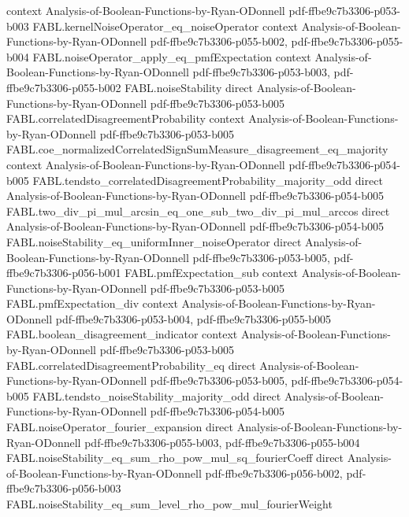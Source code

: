 \begin{theorem}
  {context}
  {Analysis-of-Boolean-Functions-by-Ryan-ODonnell}
  {pdf-ffbe9c7b3306-p053-b003}
\proofstep
  {FABL.kernelNoiseOperator_eq_noiseOperator}
  {context}
  {Analysis-of-Boolean-Functions-by-Ryan-ODonnell}
  {pdf-ffbe9c7b3306-p055-b002,
    pdf-ffbe9c7b3306-p055-b004}
\proofstep
  {FABL.noiseOperator_apply_eq_pmfExpectation}
  {context}
  {Analysis-of-Boolean-Functions-by-Ryan-ODonnell}
  {pdf-ffbe9c7b3306-p053-b003,
    pdf-ffbe9c7b3306-p055-b002}
\proofstep
  {FABL.noiseStability}
  {direct}
  {Analysis-of-Boolean-Functions-by-Ryan-ODonnell}
  {pdf-ffbe9c7b3306-p053-b005}
\proofstep
  {FABL.correlatedDisagreementProbability}
  {context}
  {Analysis-of-Boolean-Functions-by-Ryan-ODonnell}
  {pdf-ffbe9c7b3306-p053-b005}
\proofstep
  {FABL.coe_normalizedCorrelatedSignSumMeasure_disagreement_eq_majority}
  {context}
  {Analysis-of-Boolean-Functions-by-Ryan-ODonnell}
  {pdf-ffbe9c7b3306-p054-b005}
\proofstep
  {FABL.tendsto_correlatedDisagreementProbability_majority_odd}
  {direct}
  {Analysis-of-Boolean-Functions-by-Ryan-ODonnell}
  {pdf-ffbe9c7b3306-p054-b005}
\proofstep
  {FABL.two_div_pi_mul_arcsin_eq_one_sub_two_div_pi_mul_arccos}
  {direct}
  {Analysis-of-Boolean-Functions-by-Ryan-ODonnell}
  {pdf-ffbe9c7b3306-p054-b005}
\proofstep
  {FABL.noiseStability_eq_uniformInner_noiseOperator}
  {direct}
  {Analysis-of-Boolean-Functions-by-Ryan-ODonnell}
  {pdf-ffbe9c7b3306-p053-b005,
    pdf-ffbe9c7b3306-p056-b001}
\proofstep
  {FABL.pmfExpectation_sub}
  {context}
  {Analysis-of-Boolean-Functions-by-Ryan-ODonnell}
  {pdf-ffbe9c7b3306-p053-b005}
\proofstep
  {FABL.pmfExpectation_div}
  {context}
  {Analysis-of-Boolean-Functions-by-Ryan-ODonnell}
  {pdf-ffbe9c7b3306-p053-b004,
    pdf-ffbe9c7b3306-p055-b005}
\proofstep
  {FABL.boolean_disagreement_indicator}
  {context}
  {Analysis-of-Boolean-Functions-by-Ryan-ODonnell}
  {pdf-ffbe9c7b3306-p053-b005}
\proofstep
  {FABL.correlatedDisagreementProbability_eq}
  {direct}
  {Analysis-of-Boolean-Functions-by-Ryan-ODonnell}
  {pdf-ffbe9c7b3306-p053-b005,
    pdf-ffbe9c7b3306-p054-b005}
\proofstep
  {FABL.tendsto_noiseStability_majority_odd}
  {direct}
  {Analysis-of-Boolean-Functions-by-Ryan-ODonnell}
  {pdf-ffbe9c7b3306-p054-b005}
\proofstep
  {FABL.noiseOperator_fourier_expansion}
  {direct}
  {Analysis-of-Boolean-Functions-by-Ryan-ODonnell}
  {pdf-ffbe9c7b3306-p055-b003,
    pdf-ffbe9c7b3306-p055-b004}
\proofstep
  {FABL.noiseStability_eq_sum_rho_pow_mul_sq_fourierCoeff}
  {direct}
  {Analysis-of-Boolean-Functions-by-Ryan-ODonnell}
  {pdf-ffbe9c7b3306-p056-b002,
    pdf-ffbe9c7b3306-p056-b003}
\proofstep
  {FABL.noiseStability_eq_sum_level_rho_pow_mul_fourierWeight}

\end{theorem}
